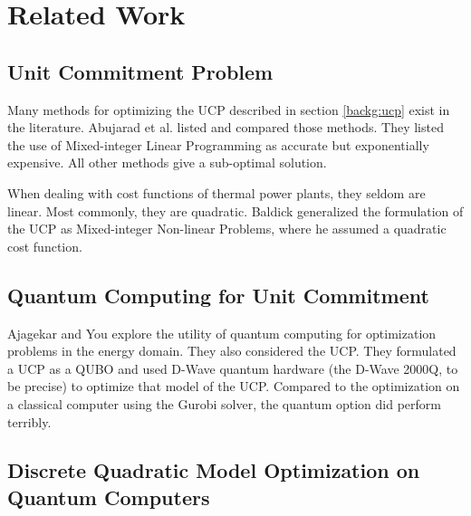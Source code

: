 \section{Related Work}

\subsection{Unit Commitment Problem}

Many methods for optimizing the UCP described in section \ref{backg:ucp} exist in the literature.
Abujarad et al. \cite{Abujarad2017} listed and compared those methods.
They listed the use of Mixed-integer Linear Programming as accurate but exponentially expensive.
All other methods give a sub-optimal solution.
\cite{Abujarad2017}

When dealing with cost functions of thermal power plants, they seldom are linear.
Most commonly, they are quadratic.
Baldick \cite{Baldick1995} generalized the formulation of the UCP as Mixed-integer Non-linear Problems, where he assumed a quadratic cost function.

\subsection{Quantum Computing for Unit Commitment}

Ajagekar and You \cite{Ajagekar2019} explore the utility of quantum computing for optimization problems in the energy domain.
They also considered the UCP.
They formulated a UCP as a QUBO and used D-Wave quantum hardware (the D-Wave 2000Q, to be precise) to optimize that model of the UCP.
Compared to the optimization on a classical computer using the Gurobi solver, the quantum option did perform terribly.
\cite{Ajagekar2019}

\subsection{Discrete Quadratic Model Optimization on Quantum Computers}
